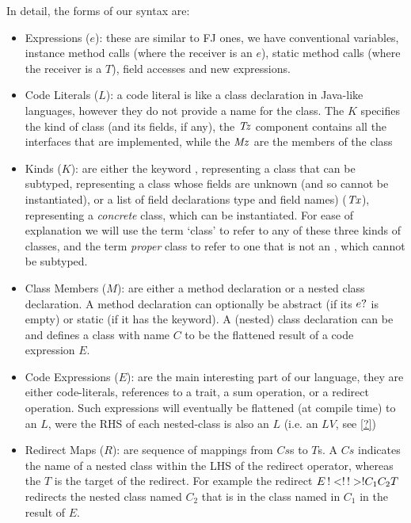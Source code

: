 In detail, the forms of our syntax are:
\begin{itemize}
	\item Expressions ($e$): these are similar to FJ ones, we have conventional variables, instance method calls (where the receiver is an $e$), static method calls (where the receiver is a $T$), field accesses and new expressions.
	
	\item Code Literals ($L$): a code literal is like a class declaration in Java-like languages, however they do not provide a name for the class. The $K$ specifies the kind of class (and its fields, if any), the $\mathit{Tz}$ component contains all the interfaces that are implemented, while the $\mathit{Mz}$ are the members of the class 
	
	\item Kinds ($K$): are either the keyword , representing a class that can be subtyped,  representing a class whose fields are unknown (and so cannot be instantiated), or a list of field declarations type and field names) ($\mathit{Tx}$), representing a \emph{concrete} class, which can be instantiated. For ease of explanation we will use the term `class' to refer to any of these three kinds of classes, and the term \emph{proper} class to refer to one that is not an , which cannot be subtyped.
	
	\item Class Members ($M$): are either a method declaration or a nested class declaration. A method declaration can optionally be abstract (if its $e?$ is empty) or static (if it has the  keyword). A (nested) class declaration can be  and defines a class with name $C$ to be the flattened result of a code expression $E$.	

	\item Code Expressions ($E$): are the main interesting part of our language, they are either code-literals, references to a trait, a sum operation, or a redirect operation. Such expressions will eventually be flattened (at compile time) to an $L$, were the RHS of each nested-class is also an $L$ (i.e. an $LV$, see \autoref{?})
	\item Redirect Maps ($R$): are sequence of mappings from $Cs$s to $T$s. A $Cs$ indicates the name of a nested class within the LHS of the redirect operator, whereas the $T$ is the target of the redirect. For example the redirect $\red{E}{\Cs{C_1}{C_2}}{T}$ redirects the nested class named $C_2$ that is in the class named in $C_1$ in the result of $E$.
	

\end{itemize}
